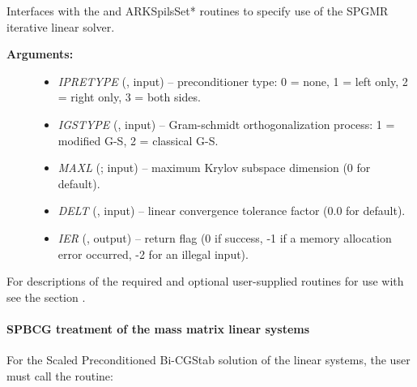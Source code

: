 \documentclass[letterpaper,10pt,english]{sphinxmanual}
\begin{document}
\begin{fulllineitems}
\label{f_interface/Usage:f/_/FARKMASSSPGMR}
Interfaces with the {\hyperref[c_interface/User_callable:c.ARKMassSpgmr]{\emph{}}} and ARKSpilsSet*
routines to specify use of the SPGMR iterative linear solver.
\begin{description}
\item[{\textbf{Arguments:}}] \leavevmode\begin{itemize}
\item {} 
\emph{IPRETYPE} (, input) -- preconditioner type: 0 = none,
1 = left only, 2 = right only, 3 = both sides.

\item {} 
\emph{IGSTYPE} (, input) -- Gram-schmidt orthogonalization
process: 1 = modified G-S, 2 = classical G-S.

\item {} 
\emph{MAXL} (; input) -- maximum Krylov subspace dimension
(0 for default).

\item {} 
\emph{DELT} (, input) -- linear convergence tolerance
factor (0.0 for default).

\item {} 
\emph{IER} (, output) -- return flag (0 if success, -1 if a
memory allocation error occurred, -2 for an illegal input).

\end{itemize}

\end{description}

\end{fulllineitems}


For descriptions of the required and optional user-supplied routines
for use with {\hyperref[f_interface/Usage:f/_/FARKMASSSPGMR]{\emph{}}} see the section
{\hyperref[f_interface/Usage:finterface-massspilsusersupplied]{\emph{}}}.


\paragraph{SPBCG treatment of the mass matrix linear systems}
\label{f_interface/Usage:spbcg-treatment-of-the-mass-matrix-linear-systems}
For the Scaled Preconditioned Bi-CGStab solution of the linear systems,
the user must call the {\hyperref[f_interface/Usage:f/_/FARKMASSSPBCG]{\emph{}}} routine:
\end{document}
